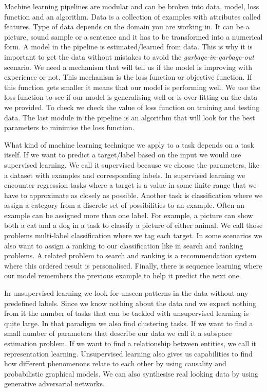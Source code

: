 \documentclass[a4paper]{article}
\begin{document}
Machine learning pipelines are modular and can be broken into data, model, loss function and an algorithm. Data is a collection of examples with attributes called features. Type of data depends on the domain you are working in. It can be a picture, sound sample or a sentence and it has to be transformed into a numerical form. A model in the pipeline is estimated/learned from data. This is why it is important to get the data without mistakes to avoid the \emph{garbage-in-garbage-out} scenario. We need a mechanism that will tell us if the model is improving with experience or not. This mechanism is the loss function or objective function. If this function gets smaller it means that our model is performing well. We use the loss function to see if our model is generalising well or is over-fitting on the data we provided. To check we check the value of loss function on training and testing data. The last module in the pipeline is an algorithm that will look for the best parameters to minimise the loss function.

What kind of machine learning technique we apply to a task depends on a task itself. If we want to predict a target/label based on the input we would use supervised learning. We call it supervised because we choose the parameters, like a dataset with examples and corresponding labels. In supervised learning we encounter regression tasks where a target is a value in some finite range that we have to approximate as closely as possible. Another task is classification where we assign a category from a discrete set of possibilities to an example. Often an example can be assigned more than one label. For example, a picture can show both a cat and a dog in a task to classify a picture of either animal. We call those problems multi-label classification where we tag each target. In some scenarios we also want to assign a ranking to our classification like in search and ranking problems. A related problem to search and ranking is a recommendation system where this ordered result is personalised. Finally, there is sequence learning where our model remembers the previous example to help it predict the next one.

In unsupervised learning we look for unseen patterns in the data without any predefined labels. Since we know nothing about the data and we expect nothing from it the number of tasks that can be tackled with unsupervised learning is quite large. In that paradigm we also find clustering tasks. If we want to find a small number of parameters that describe our data we call it a subspace estimation problem. If we want to find a relationship between entities, we call it representation learning. Unsupervised learning also gives us capabilities to find how different phenomenons relate to each other by using causality and probabilistic graphical models. We can also synthesise real looking data by using generative adversarial networks.
\end{document}
